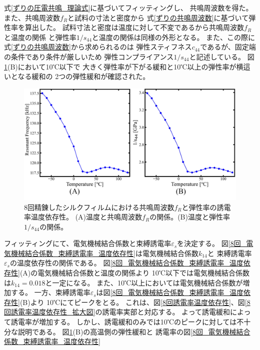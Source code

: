 \documentclass[dvipdfmx,12pt,a4paper]{jreport}
\begin{document}
			式\ref{ずりの圧電共鳴_理論式}に基づいてフィッティングし、
			共鳴周波数を得た。また、共鳴周波数$f_R$と試料の寸法と密度から
			式\ref{ずりの共鳴周波数}に基づいて弾性率を算出した。
			試料寸法と密度は温度に対して不変であるから共鳴周波数$f_R$と温度の関係
			と弾性率$1/s_{44}$と温度の関係は同様の外形となる。
			また、この際に式\ref{ずりの共鳴周波数}から求められるのは
			弾性スティフネス$c_{44}$であるが、固定端の条件であり条件が厳しいため
			弾性コンプライアンス$1/s_{44}$と記述している。
			図\ref{8回_共鳴周波数_弾性率_温度依存性}(B)において10℃以下で
			大きく弾性率が下がる緩和と10℃以上の弾性率が横這いとなる緩和の
			2つの弾性緩和が確認された。
			\begin{figure}[H]
				\centering
				\includegraphics[width=\linewidth]{8回_共鳴周波数_弾性率_温度依存性.jpg}
				\caption{8回精錬したシルクフィルムにおける共鳴周波数$f_R$と弾性率の誘電率温度依存性。
				(A)温度と共鳴周波数$f_R$の関係。(B)温度と弾性率$1/s_{44}$の関係。}
				\label{8回_共鳴周波数_弾性率_温度依存性}
			\end{figure}
			\newpage
			フィッティングにて、電気機械結合係数と束縛誘電率$\varepsilon_s$を決定する。
			図\ref{8回_電気機械結合係数_束縛誘電率_温度依存性}は電気機械結合係数$k_{14}$と
			束縛誘電率$\varepsilon_s$の温度依存性の関係である。
			図\ref{8回_電気機械結合係数_束縛誘電率_温度依存性}(A)の電気機械結合係数と温度の関係より
			10℃以下では電気機械結合係数は$k_{14}=0.018$と一定になる。
			また、10℃以上においては電気機械結合係数が増加する。
			一方、束縛誘電率$\varepsilon_s$は図\ref{8回_電気機械結合係数_束縛誘電率_温度依存性}(B)より
			10℃にてピークをとる。
			これは、図\ref{8回誘電率温度依存性}、図\ref{8回誘電率温度依存性_拡大図}の誘電率実部と対応する。
			よって誘電緩和によって誘電率が増加する。
			しかし、誘電緩和のみでは10℃のピークに対しては不十分な説明である。
			図\ref{8回_共鳴周波数_弾性率_温度依存性}(B)の高温側の弾性緩和と
			誘電率の図\ref{8回_電気機械結合係数_束縛誘電率_温度依存性}
\end{document}
